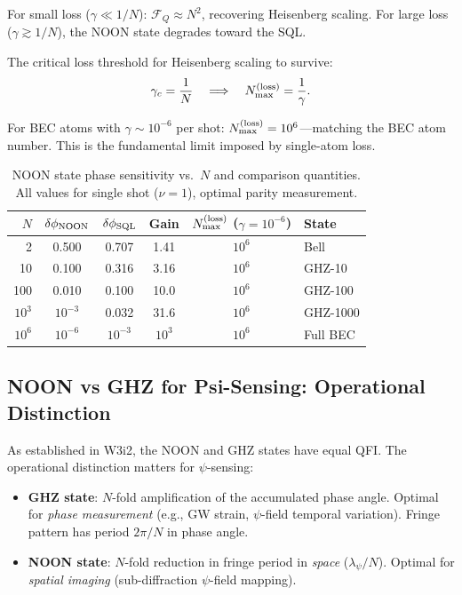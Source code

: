 \documentclass[11pt]{article}
\theoremstyle{definition}
\theoremstyle{remark}
\begin{document}
For small loss ($\gamma \ll 1/N$): $\mathcal{F}_Q \approx N^2$, recovering
Heisenberg scaling. For large loss ($\gamma \gtrsim 1/N$), the NOON state
degrades toward the SQL.

The critical loss threshold for Heisenberg scaling to survive:
\begin{equation}
\gamma_c = \frac{1}{N}
\quad \Longrightarrow \quad
N_{\max}^{(\rm loss)} = \frac{1}{\gamma}.
\label{eq:noon-loss-threshold}
\end{equation}

For BEC atoms with $\gamma \sim 10^{-6}$ per shot:
$N_{\max}^{(\rm loss)} = 10^6$---matching the BEC atom number. This is the
fundamental limit imposed by single-atom loss.

\begin{table}[h]
\centering
\caption{NOON state phase sensitivity vs.\ $N$ and comparison quantities.
All values for single shot ($\nu=1$), optimal parity measurement.}
\begin{tabular}{@{}rccccl@{}}
\toprule
$N$ & $\delta\phi_{\rm NOON}$ & $\delta\phi_{\rm SQL}$ & Gain & $N_{\max}^{(\rm loss)}$ ($\gamma=10^{-6}$) & State \\
\midrule
2 & 0.500 & 0.707 & 1.41 & $10^6$ & Bell \\
10 & 0.100 & 0.316 & 3.16 & $10^6$ & GHZ-10 \\
100 & 0.010 & 0.100 & 10.0 & $10^6$ & GHZ-100 \\
$10^3$ & $10^{-3}$ & 0.032 & 31.6 & $10^6$ & GHZ-1000 \\
$10^6$ & $10^{-6}$ & $10^{-3}$ & $10^3$ & $10^6$ & Full BEC \\
\bottomrule
\end{tabular}
\end{table}

\subsection{NOON vs GHZ for Psi-Sensing: Operational Distinction}

As established in W3i2, the NOON and GHZ states have equal QFI. The
operational distinction matters for $\psi$-sensing:

\begin{itemize}
\item \textbf{GHZ state}: $N$-fold amplification of the accumulated phase
  angle. Optimal for \emph{phase measurement} (e.g., GW strain, $\psi$-field
  temporal variation). Fringe pattern has period $2\pi/N$ in phase angle.

\item \textbf{NOON state}: $N$-fold reduction in fringe period in \emph{space}
  ($\lambda_\psi/N$). Optimal for \emph{spatial imaging}
  (sub-diffraction $\psi$-field mapping).
\end{itemize}
\end{document}
